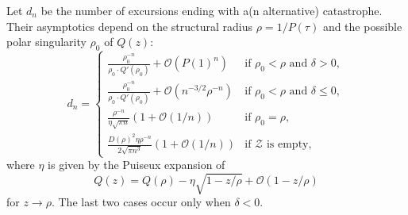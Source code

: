 \begin{theorem}
\label{thm:asym_D(z)}
  Let $d_n$ be the number of excursions ending with a(n alternative) catastrophe. Their asymptotics depend on the structural radius $\rho = 1/P(\tau)$ and the possible polar singularity $\rho_0$ of $Q(z)$:
  \begin{equation*}
    d_n =
    \begin{cases}
    \frac{\rho_0^{-n}}{\rho_0 \cdot Q'(\rho_0)} + 
    \mathcal{O}(P(1)^n) 
    & \text{if $\rho_0 < \rho$ and $\delta > 0$}, \\[8pt]
    \frac{\rho_0^{-n}}{\rho_0 \cdot Q'(\rho_0)} + 
    \mathcal{O}(n^{-3/2}\rho^{-n}) & 
    \text{if $\rho_0 < \rho$ and $\delta \leq 0$}, \\[8pt]
    \frac{\rho^{-n}}{\eta\sqrt{\pi n}}
    \left(1 + \mathcal{O}\left(1/n\right)\right) 
    & \text{if $\rho_0 = \rho$}, \\[8pt]
    \frac{D(\rho)^2\eta\rho^{-n}}{2\sqrt{\pi n^3}}
    \left(1 + \mathcal{O}\left(1/n\right)\right) & 
    \text{if $\mathcal{Z}$ is empty},
    \end{cases}
  \end{equation*}
  where $\eta$ is given by the Puiseux expansion of 
  $$
  Q(z) = Q(\rho) - \eta\sqrt{1 - z/\rho} + \mathcal{O}(1 - z/\rho)
  $$ 
  for $z \to \rho$. The last two cases occur only when $\delta < 0$.
\end{theorem}

